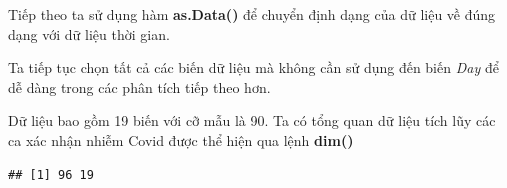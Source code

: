 \documentclass[../thesis.tex]{subfiles}
\begin{document}
Tiếp theo ta sử dụng hàm \textbf{as.Data()} để chuyển định dạng của dữ liệu về đúng dạng với dữ liệu thời gian.
\begin{Shaded}
	\begin{Highlighting}[]
\SpecialCharTok{$}\OtherTok{\textless{}{-}} \SpecialCharTok{$} \NormalTok{)}
\SpecialCharTok{$}\OtherTok{\textless{}{-}} \SpecialCharTok{$} \NormalTok{)}
	\end{Highlighting}
\end{Shaded}

Ta tiếp tục chọn tất cả các biến dữ liệu mà không cần sử dụng đến biến \textit{Day} để dễ dàng trong các phân tích tiếp theo hơn.

\begin{Shaded}
	\begin{Highlighting}[]
\OtherTok{\textless{}{-}}\SpecialCharTok{\%\textgreater{}\%} \SpecialCharTok{{-}}
\OtherTok{\textless{}{-}}\SpecialCharTok{\%\textgreater{}\%} \SpecialCharTok{{-}}
	\end{Highlighting}
\end{Shaded}

Dữ liệu bao gồm 19 biến với cỡ mẫu là 90. Ta có tổng quan dữ liệu tích lũy các ca xác nhận nhiễm Covid được thể hiện qua lệnh \textbf{dim()}

\begin{Shaded}
	\begin{Highlighting}[]
\SpecialCharTok{\%\textgreater{}\%} \NormalTok{()}
	\end{Highlighting}
\end{Shaded}

\begin{verbatim}
## [1] 96 19
\end{verbatim}

\begin{Shaded}
	\begin{Highlighting}[]
\SpecialCharTok{\%\textgreater{}\%} \NormalTok{()}
	\end{Highlighting}
\end{Shaded}
\end{document}
